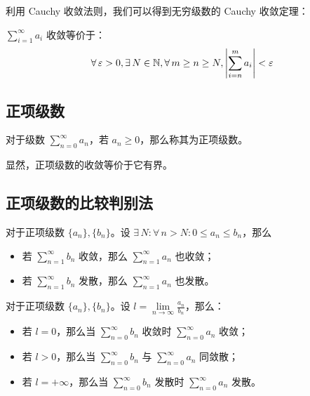 利用 Cauchy 收敛法则，我们可以得到无穷级数的 Cauchy 收敛定理：

\begin{theorem}
    $\sum\limits_{i = 1}^{\infty} a_i$ 收敛等价于：
    $$
    \forall\,\varepsilon > 0, \exists\,N \in \mathbb{N}, \forall\,m \ge n \ge N, \abs{\sum_{i = n}^{m} a_i} < \varepsilon
    $$
\end{theorem}

\subsection{正项级数}

\begin{definition}[正项级数]
    对于级数 $\sum_{n = 0}^{\infty} a_n$，若 $a_n \ge 0$，那么称其为正项级数。
\end{definition}

显然，正项级数的收敛等价于它有界。

\subsection{正项级数的比较判别法}

\begin{theorem}[比较判别法]
    对于正项级数 $\{a_n\}, \{b_n\}$。设 $\exists\,N: \forall\,n > N: 0 \le a_n \le b_n$，那么

    \begin{itemize}
        \item 若 $\sum\limits_{n = 1}^{\infty} b_n$ 收敛，那么 $\sum\limits_{n = 1}^{\infty} a_n$ 也收敛；
        \item 若 $\sum\limits_{n = 1}^{\infty} b_n$ 发散，那么 $\sum\limits_{n = 1}^{\infty} a_n$ 也发散。
    \end{itemize}
\end{theorem}

\begin{theorem}[比较判别法的极限形式]
    对于正项级数 $\{a_n\}, \{b_n\}$。设 $l = \lim\limits_{n \to \infty} \frac{a_n}{b_n}$，那么：
    \begin{itemize}        
        \item 若 $l = 0$，那么当 $\sum_{n = 0}^{\infty} b_n$ 收敛时 $\sum_{n = 0}^{\infty} a_n$ 收敛；
        \item 若 $l > 0$，那么当 $\sum_{n = 0}^{\infty} b_n$ 与 $\sum_{n = 0}^{\infty} a_n$ 同敛散；
        \item 若 $l = +\infty$，那么当 $\sum_{n = 0}^{\infty} b_n$ 发散时 $\sum_{n = 0}^{\infty} a_n$ 发散。
    \end{itemize}
\end{theorem}
